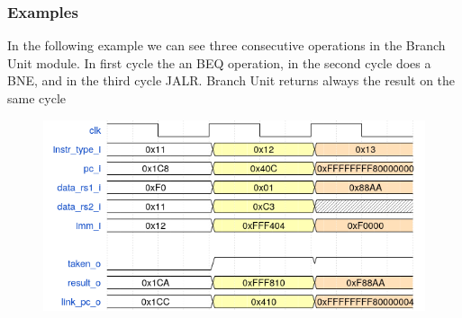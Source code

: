 \subsubsection{Examples}

In the following example we can see three consecutive operations in the Branch Unit module. In first cycle the an BEQ operation, in the second cycle does a BNE, and in the third cycle JALR.  Branch Unit returns always the result on the same cycle

\begin{figure}[h]
\centering
\includegraphics[width=1\linewidth]{wave_branch_unit.png}
\end{figure}
